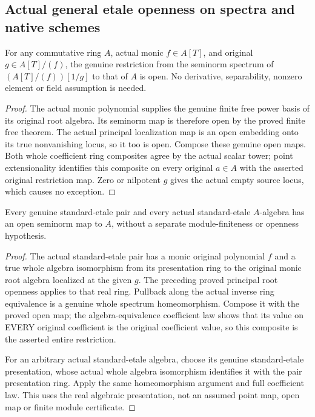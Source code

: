 \subsection{Actual general etale openness on spectra and native schemes}
\label{subsec:etale-spectrum-native-openness}

\begin{theorem}
\label{spectrum:actual-monic-root-open-map}
\leanok
{}
For any commutative ring $A$, actual monic $f\in A[T]$, and original
$g\in A[T]/(f)$, the genuine restriction from the seminorm spectrum
of $(A[T]/(f))[1/g]$ to that of $A$ is open. No derivative,
separability, nonzero element or field assumption is needed.
\end{theorem}
\begin{proof}
The actual monic polynomial supplies the genuine finite free power
basis of its original root algebra. Its seminorm map is therefore
open by the proved finite free theorem. The actual principal
localization map is an open embedding onto its true nonvanishing
locus, so it too is open. Compose these genuine open maps. Both whole
coefficient ring composites agree by the actual scalar tower; point
extensionality identifies this composite on every original $a\in A$
with the asserted original restriction map. Zero or nilpotent $g$
gives the actual empty source locus, which causes no exception.
\end{proof}

\begin{theorem}
\label{spectrum:actual-standard-etale-open-map}
\leanok
{}
Every genuine standard-etale pair and every actual standard-etale
$A$-algebra has an open seminorm map to $A$, without a separate
module-finiteness or openness hypothesis.
\end{theorem}
\begin{proof}
The actual standard-etale pair has a monic original polynomial $f$
and a true whole algebra isomorphism from its presentation ring to
the original monic root algebra localized at the given $g$. The
preceding proved principal root openness applies to that real ring.
Pullback along the actual inverse ring equivalence is a genuine
whole spectrum homeomorphism. Compose it with the proved open map;
the algebra-equivalence coefficient law shows that its value on
EVERY original coefficient is the original coefficient value, so
this composite is the asserted entire restriction.

For an arbitrary actual standard-etale algebra, choose its genuine
standard-etale presentation, whose actual whole algebra isomorphism
identifies it with the pair presentation ring. Apply the same
homeomorphism argument and full coefficient law. This uses the real
algebraic presentation, not an assumed point map, open map or finite
module certificate.
\end{proof}

